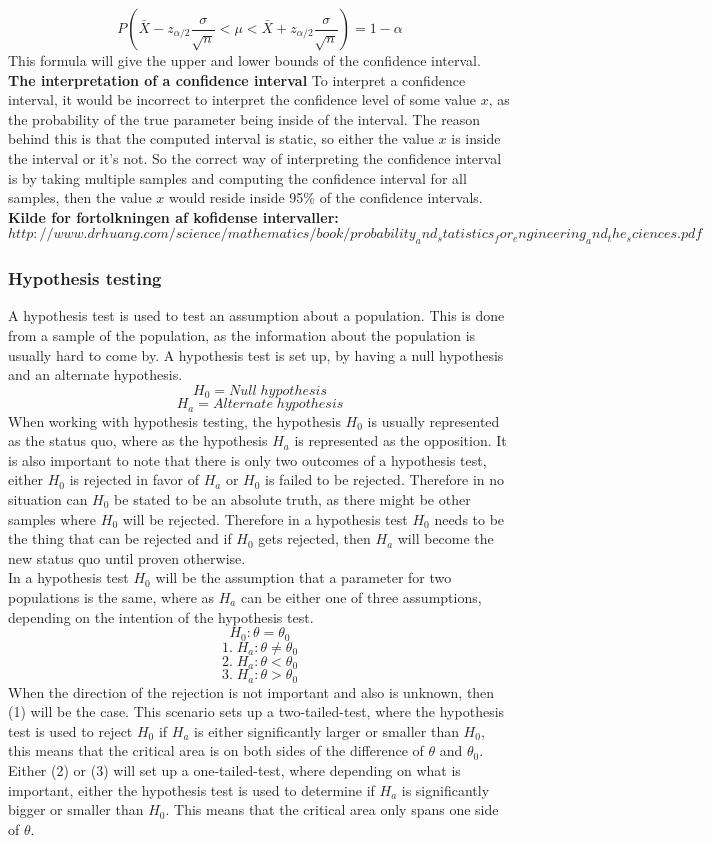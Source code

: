 $$P(\bar{X}-z_{\alpha/2}\frac{\sigma}{\sqrt{n}}<\mu<\bar{X}+z_{\alpha/2}\frac{\sigma}{\sqrt{n}})=1-\alpha$$
\newline
This formula will give the upper and lower bounds of the confidence interval.\\

\noindent \textbf{The interpretation of a confidence interval}
\newline
To interpret a confidence interval, it would be incorrect to interpret the confidence level of some value $x$, as the probability of the true parameter being inside of the interval. The reason behind this is that the computed interval is static, so either the value $x$ is inside the interval or it's not. So the correct way of interpreting the confidence interval is by taking multiple samples and computing the confidence interval for all samples, then the value $x$ would reside inside 95\% of the confidence intervals.
\textbf{Kilde for fortolkningen af kofidense intervaller:}
\newline
$http://www.drhuang.com/science/mathematics/book/probability_and_statistics_for_engineering_and_the_sciences.pdf$


\subsubsection{Hypothesis testing}
A hypothesis test is used to test an assumption about a population. This is done from a sample of the population, as the information about the population is usually hard to come by. A hypothesis test is set up, by having a null hypothesis and an alternate hypothesis.
$$H_0 = Null\; hypothesis$$
$$H_a = Alternate\; hypothesis$$
When working with hypothesis testing, the hypothesis $H_0$ is usually represented as the status quo, where as the hypothesis $H_a$ is represented as the opposition. It is also important to note that there is only two outcomes of a hypothesis test, either $H_0$ is rejected in favor of $H_a$ or $H_0$ is failed to be rejected. Therefore in no situation can $H_0$ be stated to be an absolute truth, as there might be other samples where $H_0$ will be rejected. Therefore in a hypothesis test $H_0$ needs to be the thing that can be rejected and if $H_0$ gets rejected, then $H_a$ will become the new status quo until proven otherwise.\\
In a hypothesis test $H_0$ will be the assumption that a parameter for two populations is the same, where as $H_a$ can be either one of three assumptions, depending on the intention of the hypothesis test.
$$H_0: \theta = \theta_0$$
$$1.\;H_a: \theta \neq \theta_0$$
$$2.\;H_a: \theta < \theta_0$$
$$3.\;H_a: \theta > \theta_0$$
When the direction of the rejection is not important and also is unknown, then (1) will be the case. This scenario sets up a two-tailed-test, where the hypothesis test is used to reject $H_0$ if $H_a$ is either significantly larger or smaller than $H_0$, this means that the critical area is on both sides of the difference of $\theta$ and $\theta_0$. Either (2) or (3) will set up a one-tailed-test, where depending on what is important, either the hypothesis test is used to determine if $H_a$ is significantly bigger or smaller than $H_0$. This means that the critical area only spans one side of $\theta$.
 